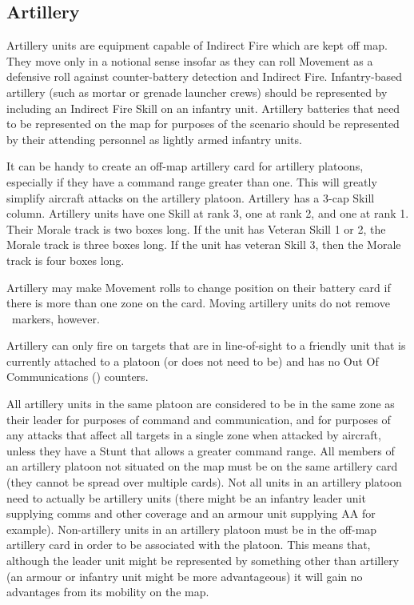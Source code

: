 \subsection{Artillery}
\label{sec:Artillery}

Artillery units are equipment capable of Indirect Fire which are kept off map. They move only in a notional sense insofar as they can roll Movement as a defensive roll against counter-battery detection and Indirect Fire. Infantry-based artillery (such as mortar or grenade launcher crews) should be represented by including an Indirect Fire Skill on an infantry unit. Artillery batteries that need to be represented on the map for purposes of the scenario should be represented by their attending personnel as lightly armed infantry units.

It can be handy to create an off-map artillery card for artillery platoons, especially if they have a command range greater than one. This will greatly simplify aircraft attacks on the artillery platoon. Artillery has a 3-cap Skill column. Artillery units have one Skill at rank 3, one at rank 2, and one at rank 1. Their Morale track is two boxes long. If the unit has Veteran Skill 1 or 2, the Morale track is three boxes long. If the unit has veteran Skill 3, then the Morale track is four boxes long.

Artillery may make Movement rolls to change position on their battery
card if there is more than one zone on the card. Moving artillery
units do not remove \SPOTTED\ markers, however.

Artillery can only fire on targets that are in line-of-sight to a
friendly unit that is currently attached to a platoon (or does not
need to be) and has no Out Of Communications (\OOC) counters.

All artillery units in the same platoon are considered to be in the
same zone as their leader for purposes of command and communication,
and for purposes of any attacks that affect all targets in a single
zone when attacked by aircraft, unless they have a Stunt that allows a
greater command range. All members of an artillery platoon not
situated on the map must be on the same artillery card (they cannot be
spread over multiple cards). Not all units in an artillery platoon
need to actually be artillery units (there might be an infantry leader
unit supplying comms and other coverage and an armour unit supplying
AA for example).
Non-artillery units in an artillery platoon must be in the off-map
artillery card in order to be associated with the platoon. This means
that, although the leader unit might be represented by something other
than artillery (an armour or infantry unit might be more advantageous)
it will gain no advantages from its mobility on the map.

